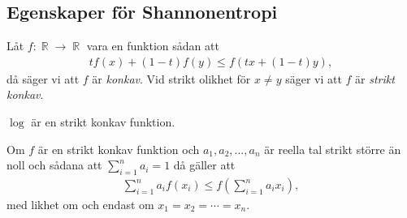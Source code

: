 \documentclass{beamer}
\DeclareMathOperator{\R}{\mathbb{R}}
\begin{document}
\subsection{Egenskaper för Shannonentropi}

\begin{frame}
  \begin{definition}
    Låt \(f\colon \R\to \R\) vara en funktion sådan att
    \begin{align*}
      tf(x) + (1-t)f(y) \leq f(tx + (1-t)y),
    \end{align*}
    då säger vi att \(f\) är \emph{konkav}.
    Vid strikt olikhet för \(x\neq y\) säger vi att \(f\) är \emph{strikt 
    konkav}.
  \end{definition}

  \begin{example}
    \(\log\) är en strikt konkav funktion.
  \end{example}
\end{frame}

%
%

\begin{frame}
  \begin{theorem}
    Om \(f\) är en strikt konkav funktion och \(a_1, a_2,\ldots, a_n\) är 
    reella tal strikt större än noll och sådana att \(\sum_{i=1}^n a_i = 1\) då 
    gäller att
    \begin{align*}
      \sum_{i=1}^n a_i f(x_i) \leq f\left( \sum_{i=1}^n a_i x_i\right),
    \end{align*}
    med likhet om och endast om \(x_1 = x_2 = \cdots = x_n\).
  \end{theorem}
\end{frame}
\end{document}
